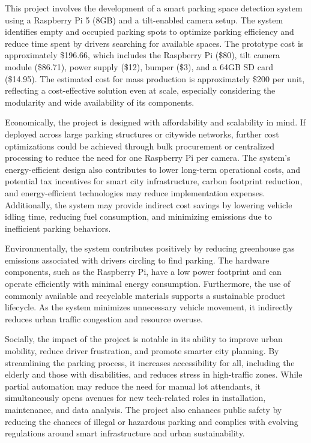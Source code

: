 \documentclass[conference]{IEEEtran}
\begin{document}
This project involves the development of a smart parking space detection system using a Raspberry Pi 5 (8GB) and a tilt-enabled camera setup. 
The system identifies empty and occupied parking spots to optimize parking efficiency and reduce time spent by drivers searching for available spaces. 
The prototype cost is approximately \$196.66, 
which includes the Raspberry Pi (\$80), 
tilt camera module (\$86.71), 
power supply (\$12), 
bumper (\$3), 
and a 64GB SD card (\$14.95). 
The estimated cost for mass production is approximately \$200 per unit, 
reflecting a cost-effective solution even at scale, 
especially considering the modularity and wide availability of its components.

Economically, 
the project is designed with affordability and scalability in mind. 
If deployed across large parking structures or citywide networks, 
further cost optimizations could be achieved through bulk procurement or centralized processing to reduce the need for one Raspberry Pi per camera. 
The system’s energy-efficient design also contributes to lower long-term operational costs, 
and potential tax incentives for smart city infrastructure, 
carbon footprint reduction, 
and energy-efficient technologies may reduce implementation expenses. 
Additionally, 
the system may provide indirect cost savings by lowering vehicle idling time, 
reducing fuel consumption, 
and minimizing emissions due to inefficient parking behaviors.

Environmentally, 
the system contributes positively by reducing greenhouse gas emissions associated with drivers circling to find parking. 
The hardware components, 
such as the Raspberry Pi, 
have a low power footprint and can operate efficiently with minimal energy consumption. 
Furthermore, 
the use of commonly available and recyclable materials supports a sustainable product lifecycle. 
As the system minimizes unnecessary vehicle movement, 
it indirectly reduces urban traffic congestion and resource overuse.

Socially, 
the impact of the project is notable in its ability to improve urban mobility, 
reduce driver frustration, 
and promote smarter city planning. 
By streamlining the parking process, 
it increases accessibility for all, 
including the elderly and those with disabilities, 
and reduces stress in high-traffic zones. 
While partial automation may reduce the need for manual lot attendants, 
it simultaneously opens avenues for new tech-related roles in installation, 
maintenance, 
and data analysis.
The project also enhances public safety by reducing the chances of illegal or hazardous parking and complies with evolving regulations around smart infrastructure and urban sustainability.
\end{document}
